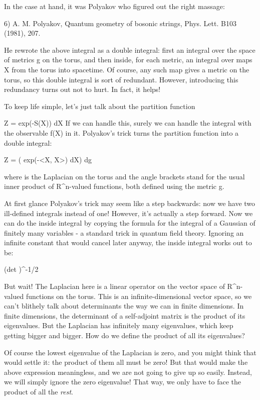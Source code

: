 In the case at hand, it was Polyakov who figured out the right massage:

6) A. M. Polyakov, Quantum geometry of bosonic strings, Phys. Lett. B103
(1981), 207.

He rewrote the above integral as a double integral: first an integral
over the space of metrics g on the torus, and then inside, for each
metric, an integral over maps X from the torus into spacetime.   Of 
course, any such map gives a metric on the torus, so this double
integral is sort of redundant.  However, introducing this redundancy
turns out not to hurt.  In fact, it helps!   

To keep life simple, let's just talk about the partition function

                     Z = \int  exp(-S(X)) dX
If we can handle this, surely we can handle the integral with the
observable f(X) in it.   Polyakov's trick turns the partition function
into a double integral:

            Z = \int  ( \int  exp(-<X, \Delta X>) dX) dg


where \Delta  is the Laplacian on the torus and the angle
brackets stand for the usual inner product of R^{n}-valued functions, both
defined using the metric g.

At first glance Polyakov's trick may seem like a step backwards: now we
have two ill-defined integrals instead of one!   However, it's actually
a step forward.  Now we can do the inside integral by copying the
formula for the integral of a Gaussian of finitely many variables - a
standard trick in quantum field theory.  Ignoring an infinite constant
that would cancel later anyway, the inside integral works out to be:

                        (det \Delta )^{-1/2}

But wait!  The Laplacian here is a linear operator on the vector space
of R^{n}-valued functions on the torus.  This is an infinite-dimensional
vector space, so we can't blithely talk about determinants the way we
can in finite dimensions.   In finite dimensions, the determinant of a
self-adjoint matrix is the product of its eigenvalues.   But the Laplacian 
has infinitely many eigenvalues, which keep getting bigger and bigger.
How do we define the product of all its eigenvalues?  

Of course the lowest eigenvalue of the Laplacian is zero, and you might
think that would settle it: the product of them all must be zero!  But
that would make the above expression meaningless, and we are not going to
give up so easily.  Instead, we will simply ignore the zero eigenvalue!
That way, we only have to face the product of all the \emph{rest}.   

